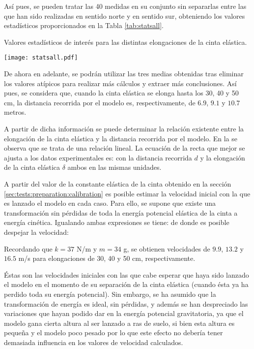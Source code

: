 Así pues, se pueden tratar las 40 medidas en su conjunto sin separarlas entre las que han sido realizadas en sentido norte y en sentido sur, obteniendo los valores estadísticos proporcionados en la Tabla \ref{tab:statsall}.

\begin{table}[ht]
  \centering
  \caption{Valores estadísticos de interés para las distintas elongaciones de la cinta elástica.}
  \label{tab:statsall}
  \texttt{[image: statsall.pdf]}
\end{table}

De ahora en adelante, se podrán utilizar las tres medias obtenidas tras eliminar los valores atípicos para realizar más cálculos y extraer más conclusiones. Así pues, se considera que, cuando la cinta elástica se elonga hasta los 30, 40 y 50 cm, la distancia recorrida por el modelo es, respectivamente, de $6.9$, $9.1$ y $10.7$ metros.

A partir de dicha información se puede determinar la relación existente entre la elongación de la cinta elástica y la distancia recorrida por el modelo. En la  se observa que se trata de una relación lineal. La ecuación de la recta que mejor se ajusta a los datos experimentales es:
con la distancia recorrida $d$ y la elongación de la cinta elástica $\delta$ ambos en las mismas unidades.

A partir del valor de la constante elástica de la cinta obtenido en la sección \ref{sec:tests:preparation:calibration} es posible estimar la velocidad inicial con la que es lanzado el modelo en cada caso. Para ello, se supone que existe una transformación sin pérdidas de toda la energía potencial elástica de la cinta a energía cinética. Igualando ambas expresiones se tiene:
de donde es posible despejar la velocidad:

Recordando que $k=37$ N/m y $m=34$ g, se obtienen velocidades de $9.9$, $13.2$ y $16.5$ m/s para elongaciones de 30, 40 y 50 cm, respectivamente.

Éstas son las velocidades iniciales con las que cabe esperar que haya sido lanzado el modelo en el momento de su separación de la cinta elástica (cuando ésta ya ha perdido toda su energía potencial). Sin embargo, se ha asumido que la transformación de energía es ideal, sin pérdidas, y además se han despreciado las variaciones que hayan podido dar en la energía potencial gravitatoria, ya que el modelo gana cierta altura al ser lanzado a ras de suelo, si bien esta altura es pequeña y el modelo poco pesado por lo que este efecto no debería tener demasiada influencia en los valores de velocidad calculados.

